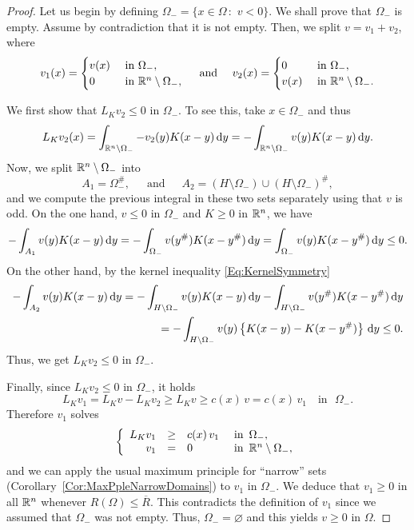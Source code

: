 \begin{proof}
	Let us begin by defining $\Omega_- = \{x\in \Omega \,:\,\, v<0\}$. We shall prove that $\Omega_-$ is empty. Assume by contradiction that it is not empty. Then, we split $ v = v_1+v_2$, where
	\begin{equation*}
	v_1(x) =
	\begin{cases}
	v(x)  &\textrm{ in } \Omega_-,\\
	0 &\textrm{ in } \mathbb{R}^n\setminus\Omega_-,
	\end{cases}
	\quad \text{ and } \quad
	v_2(x) =
	\begin{cases}
	0  &\textrm{ in } \Omega_-,\\
	v(x) &\textrm{ in } \mathbb{R}^n\setminus\Omega_-.
	\end{cases}
	\end{equation*}
	
	We first show that $L_K v_2\leq 0$ in $\Omega_-$. To see this, take $x\in\Omega_-$ and thus
	$$
	L_K v_2(x) = \int_{\mathbb{R}^n\setminus\Omega_-} -v_2(y)K(x-y) \,\mathrm{d} y = -\int_{\mathbb{R}^n\setminus\Omega_-} v(y)K(x-y) \,\mathrm{d} y.
	$$
	Now, we split $\mathbb{R}^n\setminus\Omega_-$ into
	$$
	A_1 = \Omega_-^\#,\,\,\,\,\,\,\,\text{ and }\,\,\,\,\,\,\, A_2 = \left(H\setminus\Omega_-\right)\cup\left(H\setminus\Omega_-\right)^\#,
	$$
	and we compute the previous integral in these two sets separately using that $v$ is odd. On the one hand, $v\leq 0$ in $\Omega_-$ and $K\geq 0$ in $\mathbb{R}^n$, we have
	\begin{align*}
	-\int_{A_1} v(y)K(x-y) \,\mathrm{d} y = -\int_{\Omega_-} v(y^\#)K(x-y^\#) \,\mathrm{d} y  = \int_{\Omega_-} v(y)K(x-y^\#) \,\mathrm{d} y \leq 0.
	\end{align*}
	On the other hand, by the kernel inequality \eqref{Eq:KernelSymmetry}
	\begin{align*}
	-\int_{A_2} v(y)K(x-y) \,\mathrm{d} y = -\int_{H\setminus\Omega_-} v(y)K(x-y) \,\mathrm{d} y  -\int_{H\setminus\Omega_-} v(y^\#)K(x-y^\#) \,\mathrm{d} y \\
	= -\int_{H\setminus\Omega_-} v(y)\left\{K(x-y)-K(x-y^\#)\right\} \,\mathrm{d} y \leq 0.
	\end{align*}
	Thus, we get $L_K v_2 \leq 0$ in $\Omega_-$.
	
	Finally, since $L_K v_2 \leq 0$ in $\Omega_-$, it holds
	$$ 
	L_K v_1 = L_K v-L_K v_2 \geq L_K v \geq c(x)\,v = c(x)\,v_1 \,\,\,\,\text{ in }\,\,\Omega_-. 
	$$
	Therefore $v_1$ solves
	\begin{equation*}
	\left\{\begin{array}{rcll}
	L_K v_1 &\geq& c(x)\,v_1   &\textrm{ in } \,\Omega_-,\\
	v_1 &=& 0 &\textrm{ in }\,\mathbb{R}^n\setminus\Omega_-,
	\end{array} \right.
	\end{equation*}
	and we can apply the usual maximum principle for ``narrow'' sets (Corollary~\ref{Cor:MaxPpleNarrowDomains}) to $v_1$ in $\Omega_-$.  We deduce that $v_1\geq 0$ in all $\mathbb{R}^n$ whenever $R(\Omega)\leq \overline{R}$. This contradicts the definition of $v_1$ since we assumed that $\Omega_-$ was not empty. Thus, $\Omega_- = \varnothing$ and this yields $v\geq 0$ in $\Omega$.
\end{proof}


